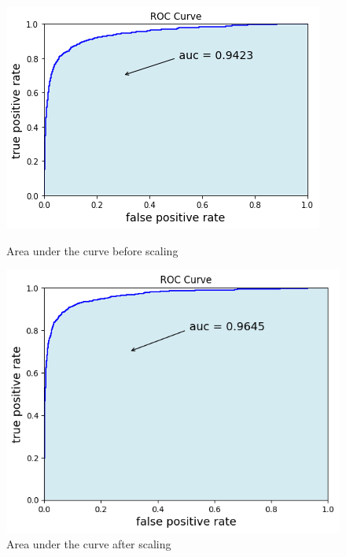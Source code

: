\documentclass[11pt]{article}
\begin{document}
\begin{figure}
    \includegraphics*{ROC_orig.png}
    \caption{Area under the curve before scaling}
    \includegraphics*{ROC_scaled.png}
    \caption{Area under the curve after scaling}
\end{figure}
\end{document}
